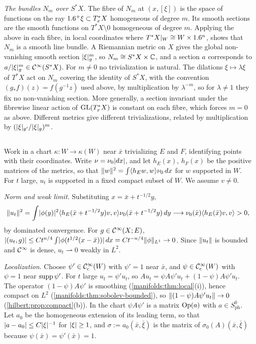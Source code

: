 \emph{The bundles $N_m$ over $S^*X$.} The fibre of $N_m$ at $(x,[\xi])$ is the space of
functions on the ray $1.6^+\xi\subset T^*_xX$ homogeneous of degree $m$. Its smooth sections are
the smooth functions on $T^*X\setminus0$ homogeneous of degree $m$. Applying the above in each
fibre, in local coordinates where $T^*X|_W\cong W\times1.6^n$, shows that $N_m$ is a smooth
line bundle. A Riemannian metric on $X$ gives the global non-vanishing smooth section
$\lvert \xi\rvert^m_g$, so $N_m\cong S^*X\times\mathbb{C}$, and a section $a$ corresponds to
$a/\lvert \xi\rvert_g^m\in\mathcal{C}^\infty(S^*X)$. For $m\ne0$ no trivialization is natural. The dilations
$\xi\mapsto\lambda\xi$ of $T^*X$ act on $N_m$ covering the identity of $S^*X$, with the convention
$(g_*f)(z)=f(g^{-1}z)$ used above, by multiplication by $\lambda^{-m}$, so for $\lambda\ne1$ they fix
no non-vanishing section. More generally, a section invariant
under the fibrewise linear action of $\operatorname{GL}(T^*_xX)$ is constant on each fibre, which forces
$m=0$ as above. Different metrics give different trivializations, related by
multiplication by $(\lvert \xi\rvert_{g'}/\lvert \xi\rvert_g)^m$.

\subsection*{}
Work in a chart $\kappa:W\to\kappa(W)$ near $\bar x$ trivializing $E$ and $F$, identifying points
with their coordinates. Write $\nu=\nu_0\lvert dx\rvert$, and let $h_E(x)$, $h_F(x)$ be the positive
matrices of the metrics, so that $\lVert w\rVert^2=\int\langle h_Ew,w\rangle\nu_0\,dx$ for $w$ supported
in $W$. For $t$ large, $u_t$ is supported in a fixed compact subset of $W$. We assume
$v\ne0$.

\emph{Norm and weak limit.} Substituting $x=\bar x+t^{-1/2}y$,
\begin{equation*}
\lVert u_t\rVert^2=\int\lvert \phi(y)\rvert^2\langle h_E(\bar x+t^{-1/2}y)v,v\rangle\nu_0(\bar x+t^{-1/2}y)\,dy
\longrightarrow\nu_0(\bar x)\langle h_E(\bar x)v,v\rangle>0 ,
\end{equation*}
by dominated convergence. For $g\in\mathcal{C}^\infty(X;E)$,
$\lvert ( u_t, g)\rvert\le Ct^{n/4}\int\lvert \phi(t^{1/2}(x-\bar x))\rvert\,dx=Ct^{-n/4}\lVert \phi\rVert_{L^1}\to0$. Since
$\lVert u_t\rVert$ is bounded and $\mathcal{C}^\infty$ is dense, $u_t\rightharpoonup0$ weakly in $L^2$.

\emph{Localization.} Choose $\psi'\in\mathcal{C}^\infty_{\mathrm{c}}(W)$ with $\psi'=1$ near $\bar x$, and $\psi\in\mathcal{C}^\infty_{\mathrm{c}}(W)$
with $\psi=1$ near $\operatorname{supp}\psi'$. For $t$ large $u_t=\psi'u_t$, so
$Au_t=\psi A\psi'u_t+(1-\psi)A\psi'u_t$. The operator $(1-\psi)A\psi'$ is smoothing
(\cref{manifolds:thm:local}(i)), hence compact on $L^2$
(\cref{manifolds:thm:sobolev-bounded}), so $\lVert (1-\psi)A\psi'u_t\rVert\to0$
(\cref{hilbert:prop:compact}(b)). In the chart $\psi A\psi'$ is a matrix $\operatorname{Op}(a)$ with
$a\in S^0_{\mathrm{ph}}$. Let $a_0$ be the homogeneous extension of its leading term, so
that $\lvert a-a_0\rvert\le C\lvert \xi\rvert^{-1}$ for $\lvert \xi\rvert\ge1$, and $\sigma:=a_0(\bar x,\bar\xi)$ is the matrix of
$\sigma_0(A)(\bar x,\bar\xi)$ because $\psi(\bar x)=\psi'(\bar x)=1$.

